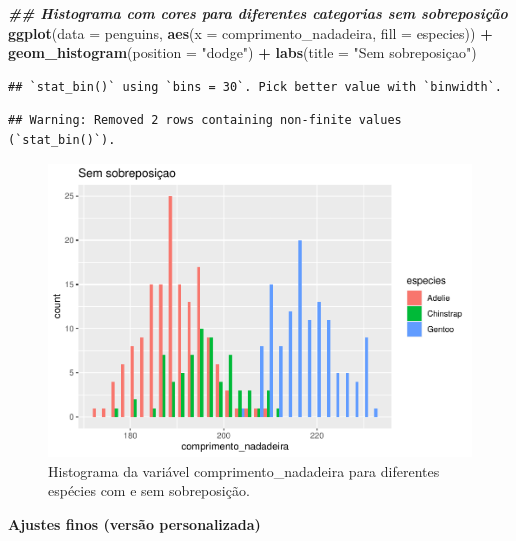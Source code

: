 \documentclass[
]{article}
\newenvironment{Shaded}{\begin{snugshade}}{\end{snugshade}}
\newcommand{\AttributeTok}[1]{\textcolor[rgb]{0.13,0.29,0.53}{#1}}
\newcommand{\DocumentationTok}[1]{\textcolor[rgb]{0.56,0.35,0.01}{\textbf{\textit{#1}}}}
\newcommand{\FunctionTok}[1]{\textcolor[rgb]{0.13,0.29,0.53}{\textbf{#1}}}
\newcommand{\NormalTok}[1]{#1}
\newcommand{\SpecialCharTok}[1]{\textcolor[rgb]{0.81,0.36,0.00}{\textbf{#1}}}
\newcommand{\StringTok}[1]{\textcolor[rgb]{0.31,0.60,0.02}{#1}}
\begin{document}
\begin{Shaded}
\begin{Highlighting}[]
\DocumentationTok{\#\# Histograma com cores para diferentes categorias sem sobreposição}
\FunctionTok{ggplot}\NormalTok{(}\AttributeTok{data =}\NormalTok{ penguins, }
       \FunctionTok{aes}\NormalTok{(}\AttributeTok{x =}\NormalTok{ comprimento\_nadadeira, }\AttributeTok{fill =}\NormalTok{ especies)) }\SpecialCharTok{+} 
      \FunctionTok{geom\_histogram}\NormalTok{(}\AttributeTok{position =} \StringTok{"dodge"}\NormalTok{) }\SpecialCharTok{+} 
       \FunctionTok{labs}\NormalTok{(}\AttributeTok{title =} \StringTok{"Sem sobreposiçao"}\NormalTok{)}
\end{Highlighting}
\end{Shaded}

\begin{verbatim}
## `stat_bin()` using `bins = 30`. Pick better value with `binwidth`.
\end{verbatim}

\begin{verbatim}
## Warning: Removed 2 rows containing non-finite values (`stat_bin()`).
\end{verbatim}

\begin{figure}
\includegraphics[width=0.75\linewidth,height=0.75\textheight]{epr_files/figure-latex/fig-hist-cat-2} \caption{Histograma da variável comprimento_nadadeira para diferentes espécies com e sem sobreposição.}\label{fig:fig-hist-cat-2}
\end{figure}

\textbf{Ajustes finos (versão personalizada)}
\end{document}
